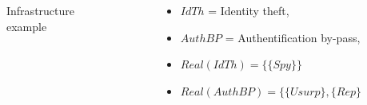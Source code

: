 \documentclass{beamer}
\begin{document}
\begin{frame}[fragile]{}
\begin{tcolorbox}[adjusted title={\centering\large Attack models}]
\begin{columns}[T]
\begin{column}{.35\textwidth}
\begin{tcolorbox}
\begin{itemize}
                    \end{itemize}
                \end{tcolorbox}
            \end{column}
            \begin{column}{.65\textwidth}
                \begin{tcolorbox}[
                colback=white, %
                colframe=normalTitleBlockColor, %
                colframe=gray!20, %
                boxrule=1mm,
                coltext=black, %
                coltitle=black, %
                bottom=2mm,
                equal height group=D,
                valign = center,
                adjusted title={\large Approach}]
                    \vspace{-1.25em}
                    \begin{columns}[c]
                        \begin{column}{.5\textwidth}
                            \begin{figure}[htb]
                                \centering
                                \resizebox{\textwidth}{!}{
                                    
                                }
                                \vspace{-1.8em}
                                \caption{Infrastructure example}
                                \label{fig:ex_archi}
                            \end{figure}
                        \end{column}
                        \begin{column}{.5\textwidth}
                            \begin{itemize}
                                \item $IdTh$ = Identity theft,
                                \item $AuthBP$ = Authentification by-pass,
                                \item $Real(IdTh) = \{ \{ Spy \} \}$
                                \item $Real(AuthBP) = \{ \{ Usurp \}, \{ Rep \} \}$
                            \end{itemize}
                        \end{column}
                    \end{columns}

\end{tcolorbox}
\end{column}
\end{columns}
\end{tcolorbox}
\end{frame}
\end{document}
